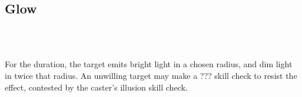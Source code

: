 \subsection*{Glow}
 \\
 \\

For the duration, the target emits bright light in a chosen radius, and dim
light in twice that radius. An unwilling target may make a ??? skill check to
resist the effect, contested by the caster's illusion skill check.
